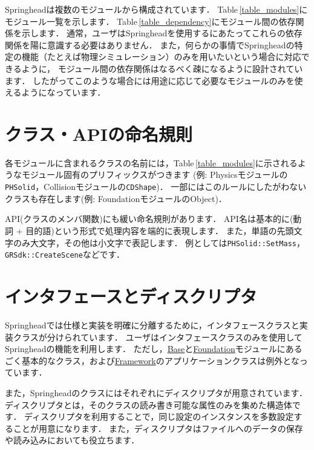 Springheadは複数のモジュールから構成されています．
Table\,\ref{table_modules}にモジュール一覧を示します．
Table\,\ref{table_dependency}にモジュール間の依存関係を示します．
\KLUDGE 通常，ユーザはSpringheadを使用するにあたってこれらの依存関係を陽に意識する必要はありません．
\KLUDGE また，何らかの事情でSpringheadの特定の機能（たとえば物理シミュレーション）のみを用いたいという場合に対応できるように，
\KLUDGE モジュール間の依存関係はなるべく疎になるように設計されています．
\KLUDGE したがってこのような場合には用途に応じて必要なモジュールのみを使えるようになっています．

\section{クラス・APIの命名規則}

\KLUDGE 各モジュールに含まれるクラスの名前には，Table\,\ref{table_modules}に示されるようなモジュール固有のプリフィックスがつきます
(例: Physicsモジュールの\texttt{PHSolid}，Collisionモジュールの\texttt{CDShape})．
\KLUDGE 一部にはこのルールにしたがわないクラスも存在します(例: FoundationモジュールのObject)．

API(クラスのメンバ関数)にも緩い命名規則があります．
API名は基本的に(動詞 + 目的語)という形式で処理内容を端的に表現します．
\KLUDGE また，単語の先頭文字のみ大文字，その他は小文字で表記します．
\KLUDGE 例としては\texttt{PHSolid::SetMass}，\texttt{GRSdk::CreateScene}などです．

\section{インタフェースとディスクリプタ} 
\label{sec_if_desc}

Springheadでは仕様と実装を明確に分離するために，インタフェースクラスと実装クラスが分けられています．
\KLUDGE ユーザはインタフェースクラスのみを使用してSpringheadの機能を利用します．
\KLUDGE ただし，\url{Base}と\url{Foundation}モジュールにあるごく基本的なクラス，および\url{Framework}のアプリケーションクラスは例外となっています．

\KLUDGE また，Springheadのクラスにはそれぞれにディスクリプタが用意されています．ディスクリプタとは，そのクラスの読み書き可能な属性のみを集めた構造体です．
\KLUDGE ディスクリプタを利用することで，同じ設定のインスタンスを多数設定することが用意になります．
\KLUDGE また，ディスクリプタはファイルへのデータの保存や読み込みにおいても役立ちます．

